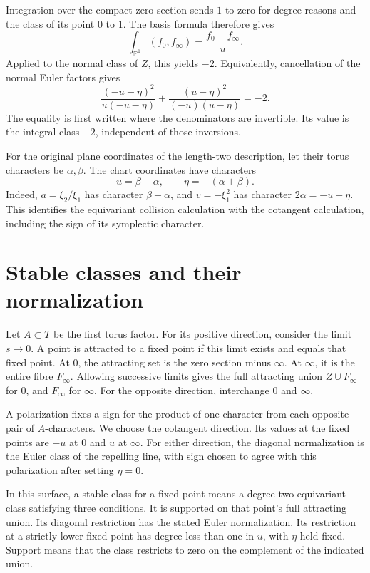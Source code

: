Integration over the compact zero section sends $1$ to zero for degree reasons and the class of its point $0$ to $1$.
The basis formula therefore gives
\[
 \int_{\mathbb P^1}(f_0,f_\infty)=\frac{f_0-f_\infty}{u}.
\]
Applied to the normal class of $Z$, this yields $-2$.
Equivalently, cancellation of the normal Euler factors gives
\begin{equation}\label{eq:gi-contact}
 \frac{(-u-\eta)^2}{u(-u-\eta)}
 +\frac{(u-\eta)^2}{(-u)(u-\eta)}=-2.
\end{equation}
The equality is first written where the denominators are invertible.
Its value is the integral class $-2$, independent of those inversions.

For the original plane coordinates of the length-two description, let their torus characters be $\alpha,\beta$.
The chart coordinates have characters
\[
 u=\beta-\alpha,\qquad \eta=-(\alpha+\beta).
\]
Indeed, $a=\xi_2/\xi_1$ has character $\beta-\alpha$, and $v=-\xi_1^2$ has character $2\alpha=-u-\eta$.
This identifies the equivariant collision calculation with the cotangent calculation, including the sign of its symplectic character.

\section{Stable classes and their normalization}

Let $A\subset T$ be the first torus factor.
For its positive direction, consider the limit $s\to0$.
A point is attracted to a fixed point if this limit exists and equals that fixed point.
At $0$, the attracting set is the zero section minus $\infty$.
At $\infty$, it is the entire fibre $F_\infty$.
Allowing successive limits gives the full attracting union $Z\cup F_\infty$ for $0$, and $F_\infty$ for $\infty$.
For the opposite direction, interchange $0$ and $\infty$.

A polarization fixes a sign for the product of one character from each opposite pair of $A$-characters.
We choose the cotangent direction.
Its values at the fixed points are $-u$ at $0$ and $u$ at $\infty$.
For either direction, the diagonal normalization is the Euler class of the repelling line, with sign chosen to agree with this polarization after setting $\eta=0$.

In this surface, a stable class for a fixed point means a degree-two equivariant class satisfying three conditions.
It is supported on that point's full attracting union.
Its diagonal restriction has the stated Euler normalization.
Its restriction at a strictly lower fixed point has degree less than one in $u$, with $\eta$ held fixed.
Support means that the class restricts to zero on the complement of the indicated union.

